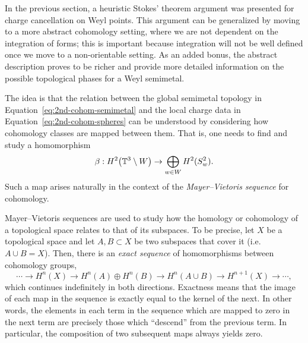 In the previous section, a heuristic Stokes' theorem argument was presented for charge cancellation on Weyl points. This argument can be generalized by moving to a more abstract cohomology setting, where we are not dependent on the integration of forms; this is important because integration will not be well defined once we move to a non-orientable setting. As an added bonus, the abstract description proves to be richer and provide more detailed information on the possible topological phases for a Weyl semimetal.

The idea is that the relation between the global semimetal topology in Equation~\eqref{eq:2nd-cohom-semimetal} and the local charge data in Equation~\eqref{eq:2nd-cohom-spheres} can be understood by considering how cohomology classes are mapped between them. That is, one needs to find and study a homomorphism
\begin{equation*}
	\beta: H^2\big(\mathbb{T}^3\setminus W\big) \to \bigoplus_{w\in W} H^2(S_w^2).
\end{equation*}
Such a map arises naturally in the context of the \emph{Mayer--Vietoris sequence} for cohomology.

Mayer--Vietoris sequences are used to study how the homology or cohomology of a topological space relates to that of its subspaces. To be precise, let $X$ be a topological space and let $A,B\subset X$ be two subspaces that cover it (i.e.\ $A\cup B = X$). Then, there is an \emph{exact sequence} of homomorphisms between cohomology groups,
\begin{equation*}
	\cdots \to H^n(X) \to H^n(A)\oplus H^n(B) \to H^n(A\cup B) \to H^{n+1}(X) \to \cdots,
\end{equation*}
which continues indefinitely %
in both directions. Exactness means that the image of each map in the sequence is exactly equal to the kernel of the next. %
In other words, the elements in each term in the sequence which are mapped to zero in the next term are precisely those which ``descend'' from the previous term. In particular, the composition of two subsequent maps always yields zero.

